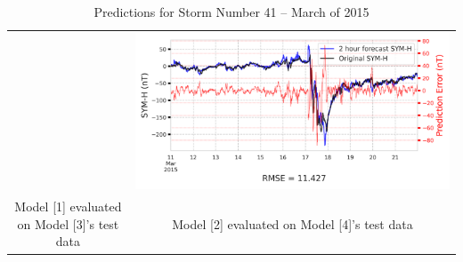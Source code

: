 \documentclass[draft,sw]{agutexSI2019}
\begin{document}
\begin{table}
\begin{tabular}{cc}
&
\includegraphics[width=0.49\linewidth]{paper_plots/2h_swics_model_on_no_swics/2h_swics_model_on_no_swics_storm_41.png}
\\
Model [1] evaluated on Model [3]'s test data & Model [2] evaluated on Model [4]'s test data
\vspace*{12pt}
\\
\end{tabular}
\caption{Predictions for Storm Number 41 -- March of 2015}
\label{storm-41}
\end{table}
\end{document}
